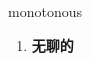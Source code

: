 
\begin{frame}
{\huge monotonous}
\begin{center}
\begin{enumerate}\Large
  \item \textbf{无聊的}
\end{enumerate}
\end{center}
\end{frame}
